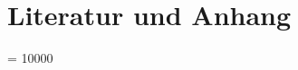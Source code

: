 \documentclass
[a4paper,german,
11pt												%
]
{scrreprt}
\begin{document}
\part{Literatur und Anhang}
\label{part_anhang}
\interlinepenalty = 10000
%
%
 {}

%
\clearpage

%
%
%
\newpage                                    
\pagestyle{empty}
\begin{figure}[H]
\centering
\end{figure}
%
\end{document}
